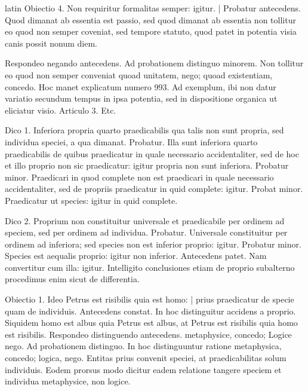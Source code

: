 \begin{otherlanguage*}{latin}
\pstart
  Obiectio 4. Non requiritur formalitas semper: igitur. \textnormal{|} Probatur antecedens. Quod dimanat ab essentia est passio, sed quod dimanat ab essentia non tollitur eo quod non semper coveniat, sed tempore statuto, quod patet in potentia visia canis possit nonum diem. 
\pend

\pstart
  Respondeo negando antecedens. Ad probationem distinguo minorem. Non tollitur eo quod non semper conveniat quoad unitatem, nego; quoad existentiam, concedo. Hoc manet explicatum numero 993. Ad exemplum, ibi non datur variatio secundum tempus in ipsa potentia, sed in dispositione organica ut eliciatur visio. Articulo 3. Etc. 
\pend

        \pstart
        \pend
      
\pstart
  Dico 1. Inferiora propria quarto praedicabilis qua talis non sunt propria, sed individua speciei, a qua dimanat. Probatur. Illa sunt inferiora quarto praedicabilis de quibus praedicatur in quale necessario accidentaliter, sed de hoc et illo proprio non sic praedicatur: igitur propria non sunt inferiora. Probatur minor. Praedicari in quod complete non est praedicari in quale necessario accidentaliter, sed de propriis praedicatur in quid complete: igitur. Probat minor. Praedicatur ut species: igitur in quid complete. 
\pend

\pstart
  Dico 2. Proprium non constituitur universale et praedicabile per ordinem ad speciem, sed per ordinem ad individua. Probatur. Universale constituitur per ordinem ad inferiora; sed species non est inferior proprio: igitur. Probatur minor. Species est aequalis proprio: igitur non inferior. Antecedens patet. Nam convertitur cum illa: igitur. Intelligito conclusiones etiam de proprio subalterno procedimus enim sicut de differentia. 
\pend

\pstart
  Obiectio 1. Ideo Petrus est risibilis quia est homo: \textnormal{|}   prius praedicatur de specie quam de individuis. Antecedens constat. In hoc distinguitur accidens a proprio. Siquidem homo est albus quia Petrus est albus, at Petrus est risibilis quia homo est risibilis. Respondeo distinguendo antecedens. metaphysice, concedo; Logice nego. Ad probationem distinguo. In hoc distinguuntur ratione metaphysica, concedo; logica, nego. Entitas prius convenit speciei, at praedicabilitas solum individuis. Eodem prorsus modo dicitur eadem relatione tangere speciem et individua metaphysice, non logice. 
\pend


\end{otherlanguage*}
